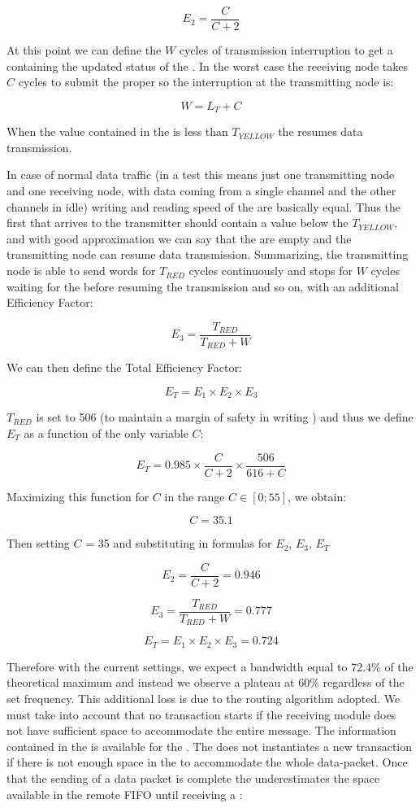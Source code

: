 $$E_{2}=\frac{C}{C+2}$$


At this point we can define the ${W}$ cycles of transmission
interruption to get a \credit containing the updated status of the
.  In the worst case the receiving node takes $C$
cycles to submit the proper \credit so the interruption at the
transmitting node is:

$$W=L_{T} + C$$


When the value contained in the \credit is less than $T_{YELLOW}$ the
 resumes data transmission.

In case of normal data traffic (in a test this means just one
transmitting node and one receiving node, with data coming from a
single channel and the other channels in idle) writing and reading
speed of the  are basically equal. Thus the first
\credit that arrives to the transmitter should contain a value below
the $T_{YELLOW}$, and with good approximation we can say that the
 are empty and the transmitting node can resume data
transmission.
Summarizing, the transmitting node is able to send words for $T_{RED}$
cycles continuously and stops for $W$ cycles waiting for the \credit
before resuming the transmission and so on, with an additional
Efficiency Factor:

$$E_{3}=\frac{T_{RED}}{T_{RED}+W}$$


We can then define the Total Efficiency Factor:

$$E_{T}=E_{1} \times E_{2} \times E_{3}$$


$T_{RED}$ is set to 506 (to maintain a margin of safety in writing
) and thus we define $E_{T}$ as a function of the only
variable $C$:

$$E_{T}=0.985 \times \frac{C}{C+2} \times \frac{506}{616+C}$$


Maximizing this function for $C$ in the range $C\in[0;55]$, we obtain:

$$C=35.1$$


Then setting $C$ = 35 and substituting in formulas for $E_{2}$,
$E_{3}$, $E_{T}$

$$E_{2}=\frac{C}{C+2}=0.946$$


$$E_{3}=\frac{T_{RED}}{T_{RED}+W}=0.777$$


$$E_{T}=E_{1} \times E_{2} \times E_{3} = 0.724$$


Therefore with the current settings, we expect a bandwidth equal to
72.4\% of the theoretical maximum and instead we observe a plateau at
60\% regardless of the set frequency.
This additional loss is due to the routing algorithm adopted. We must
take into account that no transaction starts if the receiving module
does not have sufficient space to accommodate the entire message.
The information contained in the \credit is available for the
. The  does not instantiates a new transaction
if there is not enough space in the  to accommodate
the whole data-packet. Once that the sending of a data packet is
complete the  underestimates the space available in the
remote FIFO until receiving a \credit:


